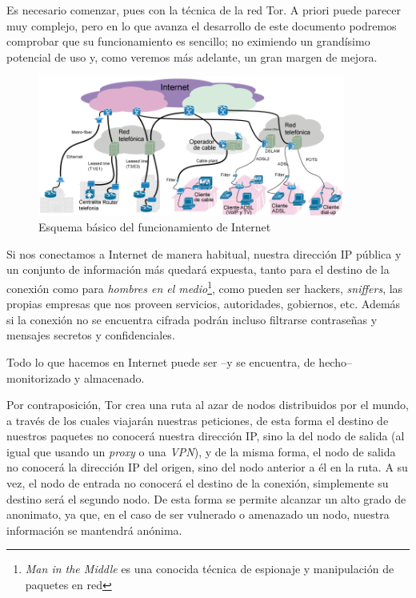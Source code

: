 \documentclass[a4paper, 11pt, titlepage]{article}
\begin{document}
    Es necesario comenzar, pues con la técnica de la red Tor. A priori puede parecer muy complejo, pero en lo que avanza 
    el desarrollo de este documento podremos comprobar que su funcionamiento es sencillo; no eximiendo un grandísimo 
    potencial de uso y, como veremos más adelante, un gran margen de mejora. 

    \begin{figure}[htp]
        \centering
        \includegraphics[width=0.9\textwidth]{resources/esquemaInternet.png}
        \caption{Esquema básico del funcionamiento de Internet}
        \label{fig:esquema}
    \end{figure}
        
    Si nos conectamos a Internet de manera habitual, nuestra dirección IP pública y un conjunto de información más quedará 
    expuesta, tanto para el destino de la conexión como para \emph{hombres en el medio}\footnote{\emph{Man in the Middle} 
    es una conocida técnica de espionaje y manipulación de paquetes en red}, como pueden ser hackers, \emph{sniffers}, las 
    propias empresas que nos proveen servicios, autoridades, gobiernos, etc. Además si la conexión no se encuentra cifrada 
    podrán incluso filtrarse contraseñas y mensajes secretos y confidenciales.

    Todo lo que hacemos en Internet puede ser --y se encuentra, de hecho-- monitorizado y almacenado.
    
    Por contraposición, Tor crea una ruta al azar de nodos distribuidos por el mundo, a través de los cuales viajarán 
    nuestras peticiones, de esta forma el destino de nuestros paquetes no conocerá nuestra dirección IP, sino la del nodo 
    de salida (al igual que usando un \emph{proxy} o una \emph{VPN}), y de la misma forma, el nodo de salida no conocerá 
    la dirección IP del origen, sino del nodo anterior a él en la ruta. A su vez, el nodo de entrada no conocerá el destino 
    de la conexión, simplemente su destino será el segundo nodo. De esta forma se permite alcanzar un alto grado de 
    anonimato, ya que, en el caso de ser vulnerado o amenazado un nodo, nuestra información se mantendrá anónima.
    
\end{document}
